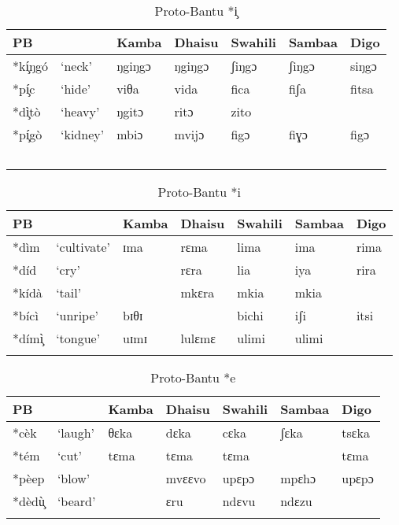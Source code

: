 \documentclass[output=paper,colorlinks,citecolor=brown]{langscibook}
\begin{document}
\begin{table}
    \caption{Proto-Bantu *i̧}
    \label{tab:ngonyani:6}
    \begin{tabular}{@{}p{1cm} p{1.4cm} p{1.3cm} p{1.3cm} p{1.3cm} p{1.3cm} p{1.3cm}@{}}
    \lsptoprule
        PB & & Kamba & Dhaisu & Swahili & Sambaa & Digo \\
        \midrule
        *kí̧ŋgó & `neck' & ŋgiŋgɔ & ŋgiŋgɔ  & ʃiŋgɔ & ʃiŋgɔ & siŋgɔ\\
        *pí̧c & `hide' & viθa & vida & fica & fiʃa & fitsa\\
        *dì̧tò & `heavy' & ŋgitɔ & ritɔ & zito &  & \\
        *pí̧gò & `kidney' & mbiɔ & mvijɔ & figɔ & fiɣɔ & figɔ \\
    \lspbottomrule\
    \end{tabular}
\end{table}
\begin{table}
    \caption{Proto-Bantu *i}
    \label{tab:ngonyani:7}
    \begin{tabular}{@{}p{1cm} p{1.4cm} p{1.3cm} p{1.3cm} p{1.3cm} p{1.3cm} p{1.3cm} @{}}
    \lsptoprule
        PB & & Kamba & Dhaisu & Swahili & Sambaa & Digo \\
        \midrule
        *dìm & `cultivate' & ɪma & rɛma  & lima & ima & rima\\ 
        *díd & `cry' &  & rɛra & lia & iya & rira\\
        *kídà & `tail' & & mkɛra & mkia & mkia & \\
        *bícì & `unripe' & bɪθɪ & & bichi & iʃi & itsi \\
        *dímì̧     & `tongue' & uɪmɪ & lulɛmɛ & ulimi & ulimi & \\
    \lspbottomrule
    \end{tabular}
\end{table}

\begin{table}
    \caption{Proto-Bantu *e}
    \label{tab:ngonyani:8}
    \begin{tabular}{@{}p{1cm} p{1.3cm} p{1.3cm} p{1.3cm} p{1.3cm} p{1.3cm} p{1.3cm}@{}}
    \lsptoprule
        PB & & Kamba & Dhaisu & Swahili & Sambaa & Digo \\
        \midrule
        *cèk & `laugh' & θɛka & dɛka  & cɛka &  ʃɛka & tsɛka \\
        *tém & `cut' & tɛma & tɛma & tɛma & & tɛma\\
        *pèep & `blow' &  & mvɛɛvo & upɛpɔ & mpɛhɔ & upɛpɔ \\
        *dèdù̧ & `beard' &  & ɛru & ndɛvu & ndɛzu & \\
    \lspbottomrule
    \end{tabular}
\end{table}
\end{document}
